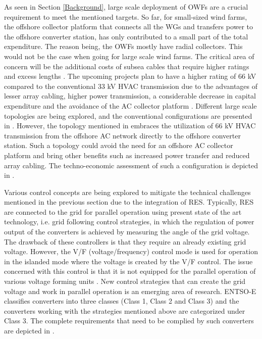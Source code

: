 As seen in Section \ref{Background}, large scale deployment of \gls{OWF}s are a crucial requirement to meet the mentioned targets. So far, for small-sized wind farms, the offshore collector platform that connects all the \gls{WG}s and transfers power to the offshore converter station, has only contributed to a small part of the total expenditure. The reason being, the \gls{OWF}s mostly have radial collectors. This would not be the case when going for large scale wind farms. The critical area of concern will be the additional costs of subsea cables that require higher ratings and excess lengths \cite{quinonez-varela_electrical_2007}. The upcoming projects plan to have a higher rating of 66 kV compared to the conventional 33 kV \gls{HVAC} transmission due to the advantages of lesser array cabling, higher power transmission, a considerable decrease in capital expenditure and the avoidance of the \gls{AC} collector platform \cite{dnv66kv}. Different large scale topologies are being explored, and the conventional configurations are presented in \cite{guan_novel_2014}. However, the topology mentioned in \cite{lozada_ayala_dynamic_2018} embraces the utilization of 66 kV \gls{HVAC} transmission from the offshore \gls{AC} network directly to the offshore converter station. Such a topology could avoid the need for an offshore \gls{AC} collector platform and bring other benefits such as increased power transfer and reduced array cabling. The techno-economic assessment of such a configuration is depicted in \cite{misyris2020north}. 

Various control concepts are being explored to mitigate the technical challenges mentioned in the previous section due to the integration of \gls{RES}. Typically, \gls{RES} are connected to the grid for parallel operation using present state of the art technology, i.e. grid following control strategies, in which the regulation of power output of the converters is achieved by measuring the angle of the grid voltage. The drawback of these controllers is that they require an already existing grid voltage. However, the V/F (voltage/frequency) control mode is used for operation in the islanded mode where the voltage is created by the V/F control. The issue concerned with this control is that it is not equipped for the parallel operation of various voltage forming units \cite{weise2019comparison}. New control strategies that can create the grid voltage and work in parallel operation is an emerging area of research. ENTSO-E classifies converters into three classes (Class 1, Class 2 and Class 3) and the converters working with the strategies mentioned above are categorized under Class 3. The complete requirements that need to be complied by such converters are depicted in \cite{christensen2020high}.

